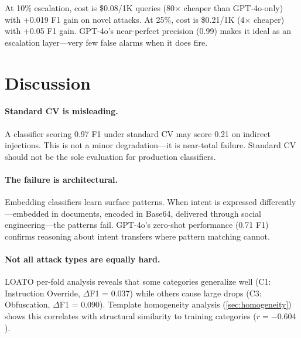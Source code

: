 \documentclass[11pt,a4paper]{article}
\newcommand{\df}{$\Delta$F1}
\newcommand{\Fone}{F1}
\begin{document}
At 10\% escalation, cost is \$0.08/1K queries (80$\times$ cheaper than
GPT-4o-only) with +0.019 \Fone{} gain on novel attacks. At 25\%, cost is
\$0.21/1K (4$\times$ cheaper) with +0.05 \Fone{} gain. GPT-4o's near-perfect
precision (0.99) makes it ideal as an escalation layer---very few false alarms
when it does fire.

\section{Discussion}
\label{sec:discussion}

\paragraph{Standard CV is misleading.}
A classifier scoring 0.97 \Fone{} under standard CV may score 0.21 on indirect
injections. This is not a minor degradation---it is near-total failure. Standard
CV should not be the sole evaluation for production classifiers.

\paragraph{The failure is architectural.}
Embedding classifiers learn surface patterns. When intent is expressed
differently---embedded in documents, encoded in Base64, delivered through social
engineering---the patterns fail. GPT-4o's zero-shot performance (0.71 \Fone{})
confirms reasoning about intent transfers where pattern matching cannot.

\paragraph{Not all attack types are equally hard.}
LOATO per-fold analysis reveals that some categories generalize well (C1:
Instruction Override, \df{} = 0.037) while others cause large drops (C3:
Obfuscation, \df{} = 0.090). Template homogeneity analysis
(\cref{sec:homogeneity}) shows this correlates with structural similarity to
training categories ($r = -0.604$).
\end{document}
